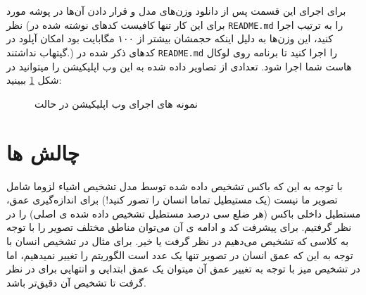 \documentclass[12pt,a4paper]{report}
\begin{document}
\section{}
برای اجرای این قسمت پس از دانلود وزن‌های مدل  و قرار دادن آن‌ها در پوشه مورد نظر (برای این کار تنها کافیست کدهای نوشته شده در \verb"README.md" را  به ترتیب اجرا کنید، این وزن‌ها به دلیل اینکه حجمشان بیشتر از ۱۰۰ مگابایت بود امکان آپلود در گیتهاب نداشتند.) کدهای ذکر شده در \verb"README.md" را اجرا کنید تا برنامه روی لوکال هاست شما اجرا شود.
تعدادی از تصاویر داده شده به این وب اپلیکیشن را میتوانید در شکل \ref{web_samp2} ببینید:
\begin{figure}
\centering
{}
  \centering
{}
\caption{نمونه های اجرای وب اپلیکیشن در حالت }
\label{web_samp2}
\end{figure}

\section{چالش ها}
با توجه به این که باکس تشخیص داده شده توسط مدل تشخیص اشیاء لزوما شامل تصویر ما نیست (یک مستیطیل تماما انسان را تصور کنید!) برای اندازه‌گیری عمق، مستطیل داخلی باکس (هر ضلع سی درصد مستطیل تشخیص داده شده ی اصلی) را در نظر گرفتیم. برای پیشرفت کد و ادامه ی آن می‌توان مناطق مختلف تصویر را با توجه به کلاسی که تشخیص می‌دهیم در نظر گرفت یا خیر. برای مثال در تشخیص انسان با توجه به این که عمق انسان در تصویر تنها یک عدد است الگوریتم را تغییر نمیدهیم، اما در تشخیص میز با توجه به تغییر عمق آن میتوان یک عمق ابتدایی و انتهایی برای در نظر گرفت تا تشخیص آن دقیق‌تر باشد.
\end{document}
